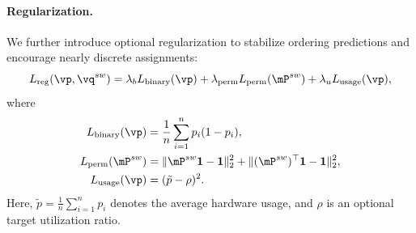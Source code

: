 \paragraph{\textbf{Regularization.}}
We further introduce optional regularization to stabilize ordering predictions and encourage nearly discrete assignments:
\begin{equation}
L_{\mathrm{reg}}(\vp,\vq^{sw})
=
\lambda_b L_{\mathrm{binary}}(\vp)
+
\lambda_{\mathrm{perm}} L_{\mathrm{perm}}(\mP^{sw})
+
\lambda_u L_{\mathrm{usage}}(\vp),
\end{equation}
where
\begin{align}
L_{\mathrm{binary}}(\vp)
&=
\frac{1}{n}\sum_{i=1}^n p_i(1-p_i),\\
L_{\mathrm{perm}}(\mP^{sw})
&=
\|\mP^{sw}\mathbf{1}-\mathbf{1}\|_2^2
+
\|(\mP^{sw})^\top\mathbf{1}-\mathbf{1}\|_2^2,\\
L_{\mathrm{usage}}(\vp)
&=
(\tilde{p}-\rho)^2.
\end{align}
Here, $\tilde{p}=\frac{1}{n}\sum_{i=1}^n p_i$ denotes the average hardware usage, and $\rho$ is an optional target utilization ratio.
